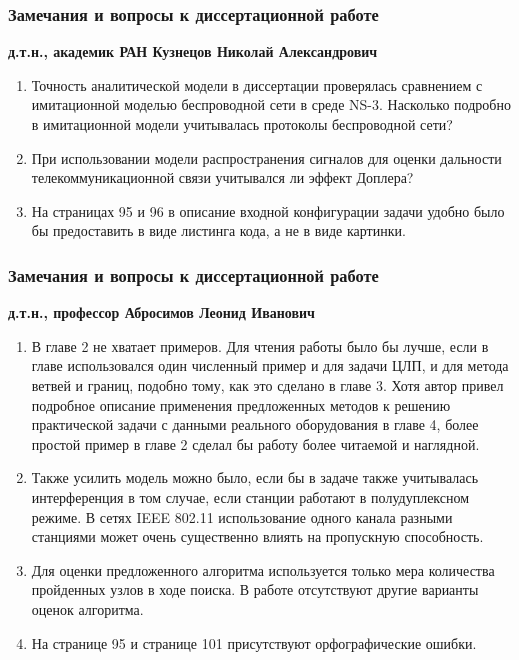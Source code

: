 \begin{frame}
    \frametitle{Замечания и вопросы к диссертационной работе}
    \fontsize{8pt}{7.2}\selectfont
    \textbf{д.т.н., академик РАН Кузнецов Николай Александрович}

    \bigskip

    \begin{enumerate}
        \item Точность аналитической модели в диссертации проверялась сравнением с имитационной моделью беспроводной сети в среде NS-3. Насколько подробно в имитационной модели учитывалась протоколы беспроводной сети?
        \item При использовании модели распространения сигналов для оценки дальности телекоммуникационной связи учитывался ли эффект Доплера?
        \item На страницах 95 и 96 в описание входной конфигурации задачи удобно было бы предоставить в виде листинга кода, а не в виде картинки.
        
    \end{enumerate}
\end{frame}


\begin{frame}
    \frametitle{Замечания и вопросы к диссертационной работе}
    \fontsize{8pt}{7.2}\selectfont
    \textbf{д.т.н., профессор Абросимов Леонид Иванович}

    \bigskip

    \begin{enumerate}
        \item В главе 2 не хватает примеров. Для чтения работы было бы лучше, если в главе использовался один численный пример и для задачи ЦЛП, и для метода ветвей и границ, подобно тому, как это сделано в главе 3. Хотя автор привел подробное описание применения предложенных методов к решению практической задачи с данными реального оборудования в главе 4, более простой пример в главе 2 сделал бы работу более читаемой и наглядной.
        \item Также усилить модель можно было, если бы в задаче также учитывалась интерференция в том случае, если станции работают в полудуплексном режиме. В сетях IEEE 802.11 использование одного канала разными станциями может очень существенно влиять на пропускную способность.
        \item Для оценки предложенного алгоритма используется только мера количества пройденных узлов в ходе поиска. В работе отсутствуют другие варианты оценок алгоритма.
        \item На странице 95 и странице 101 присутствуют орфографические ошибки.
        
    \end{enumerate}
\end{frame}


